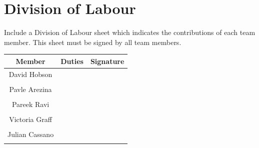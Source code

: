 \documentclass[12pt, titlepage]{article}
\begin{document}
\appendix
\section{Division of Labour}
\label{sec:division_of_labour}
Include a Division of Labour sheet which indicates the contributions of each team member. This sheet must be signed by all team members.
\begin{table}[h!]
\centering

\begin{tabular}{|c|c|c|}
\hline
{\bf Member} & {\bf Duties}&{\bf Signature}\\
\hline
{David Hobson} & { } & { }\\
{} & {}  & {}\\
\hline
{Pavle Arezina} & {} & {}\\
{} & {} & {}\\
\hline
{Pareek Ravi} & {} & {}\\
{} & {} & {}\\
\hline
{Victoria Graff} & {} & {}\\
{} & {} & {}\\
\hline
{Julian Cassano} & {} & {}\\
{} & {} & {}\\
\hline
\end{tabular}

\end{table}

\newpage
\end{document}
